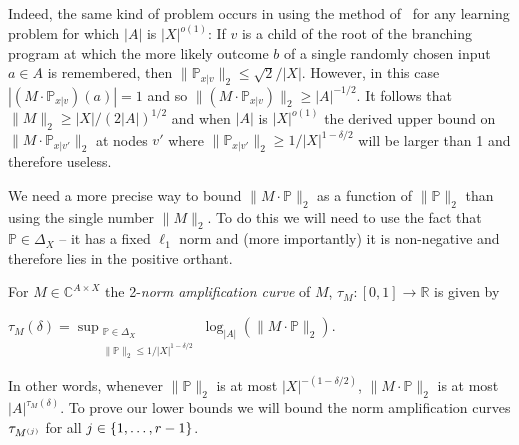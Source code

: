 Indeed, the same kind of problem occurs in using the method
of~\cite{DBLP:conf/focs/Raz17} for any learning
problem for which $|A|$ is $|X|^{o(1)}$:
If $v$ is a child of the root of the branching program at which the more
likely outcome $b$ of a single randomly chosen input $a\in A$ is remembered, then
$\|\mathbb{P}_{x|v}\|_2 \le \sqrt{2}/|X|$. 
However, in this case $|(M\cdot \mathbb{P}_{x|v})(a)|=1$ and so
$\|(M\cdot \mathbb{P}_{x|v})\|_2\ge |A|^{-1/2}$. 
It follows that $\|M\|_2\ge |X|/(2|A|)^{1/2}$ and when $|A|$ is $|X|^{o(1)}$
the derived upper bound on $\|M\cdot \mathbb{P}_{x|v'}\|_2$ at nodes $v'$
where $\|\mathbb{P}_{x|v'}\|_2\ge 1/|X|^{1-\delta/2}$ will be larger
than 1 and therefore useless.

We need a more precise way to bound $\|M\cdot \mathbb{P}\|_2$ as a function
of $\|\mathbb{P}\|_2$ than using the single number $\|M\|_2$.   
To do this we will need to use the fact that $\mathbb{P}\in \Delta_X$ -- it has
a fixed $\ell_1$ norm and (more importantly) it is non-negative and therefore
lies in the positive orthant.

\begin{defn}
For $M\in \mathbb{C}^{A\times X}$ the 2-\emph{norm amplification curve} of $M$, 
$\tau_M:[0,1]\rightarrow \mathbb{R}$ is
given by\\[+1ex]
\centerline{ $\displaystyle\tau_M(\delta)=\sup_{\substack{\mathbb{P}\in \Delta_X\\ \|\mathbb{P}\|_2\le 1/|X|^{1-\delta/2}}} \log_{|A|} (\|M\cdot \mathbb{P}\|_2)$.}
\end{defn}

In other words, whenever $\|\mathbb{P}\|_2$ is at
most $|X|^{-(1-\delta/2)}$, $\|M\cdot \mathbb{P}\|_2$ is at most
$|A|^{\tau_M(\delta)}$.
To prove our lower bounds we will bound the norm amplification curves
$\tau_{M^{(j)}}$ for all $j\in \{1,\ldots,r-1\}$.

